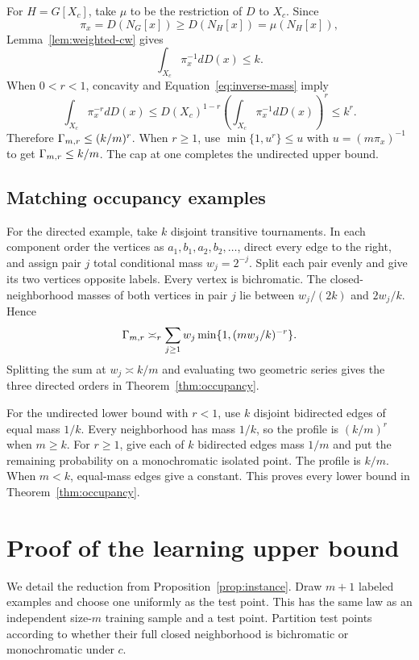 For $H=G[X_c]$, take $\mu$ to be the restriction of $D$ to $X_c$. Since
\[
\pi_x=D(N_G[x])\geq D(N_H[x])=\mu(N_H[x]),
\]
Lemma~\ref{lem:weighted-cw} gives
\begin{equation}
\int_{X_c}\pi_x^{-1}dD(x)\leq k. \label{eq:inverse-mass}
\end{equation}
When $0<r<1$, concavity and Equation~\eqref{eq:inverse-mass} imply
\[
\int_{X_c}\pi_x^{-r}dD(x)
\leq D(X_c)^{1-r}\left(\int_{X_c}\pi_x^{-1}dD(x)\right)^r
\leq k^r.
\]
Therefore $\Gamma_{m,r}\leq(k/m)^r$. When $r\geq1$, use $\min\{1,u^r\}\leq u$ with $u=(m\pi_x)^{-1}$ to get $\Gamma_{m,r}\leq k/m$. The cap at one completes the undirected upper bound.

\subsection{Matching occupancy examples}

For the directed example, take $k$ disjoint transitive tournaments. In each component order the vertices as $a_1,b_1,a_2,b_2,\ldots$, direct every edge to the right, and assign pair $j$ total conditional mass $w_j=2^{-j}$. Split each pair evenly and give its two vertices opposite labels. Every vertex is bichromatic. The closed-neighborhood masses of both vertices in pair $j$ lie between $w_j/(2k)$ and $2w_j/k$. Hence
\begin{equation}
\Gamma_{m,r}\asymp_r
\sum_{j\geq1}w_j\min\{1,(mw_j/k)^{-r}\}. \label{eq:geometric-profile}
\end{equation}
Splitting the sum at $w_j\asymp k/m$ and evaluating two geometric series gives the three directed orders in Theorem~\ref{thm:occupancy}.

For the undirected lower bound with $r<1$, use $k$ disjoint bidirected edges of equal mass $1/k$. Every neighborhood has mass $1/k$, so the profile is $(k/m)^r$ when $m\geq k$. For $r\geq1$, give each of $k$ bidirected edges mass $1/m$ and put the remaining probability on a monochromatic isolated point. The profile is $k/m$. When $m<k$, equal-mass edges give a constant. This proves every lower bound in Theorem~\ref{thm:occupancy}.

\section{Proof of the learning upper bound}
\label{app:learning-upper}

We detail the reduction from Proposition~\ref{prop:instance}. Draw $m+1$ labeled examples and choose one uniformly as the test point. This has the same law as an independent size-$m$ training sample and a test point. Partition test points according to whether their full closed neighborhood is bichromatic or monochromatic under $c$.

